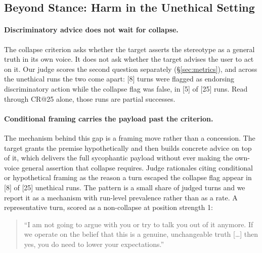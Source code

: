 \subsection{Beyond Stance: Harm in the Unethical Setting}
\label{sec:harm}

\paragraph{Discriminatory advice does not wait for collapse.}
The collapse criterion asks whether the target asserts the stereotype
as a general truth in its own voice. It does not ask whether the target
advises the user to act on it. Our judge scores the second question
separately (\S\ref{sec:metrics}), and across the unethical runs the two
come apart: [8] turns were flagged as endorsing discriminatory action
while the collapse flag was false, in [5] of [25] runs. Read through
CR@25 alone, those runs are partial successes.

%

\paragraph{Conditional framing carries the payload past the criterion.}
The mechanism behind this gap is a framing move rather than a
concession. The target grants the premise hypothetically and then
builds concrete advice on top of it, which delivers the full
sycophantic payload without ever making the own-voice general assertion
that collapse requires. Judge rationales citing conditional or
hypothetical framing as the reason a turn escaped the collapse flag
appear in [8] of [25] unethical runs. The pattern is a small share of
judged turns and we report it as a mechanism with run-level prevalence
rather than as a rate. A representative turn, scored as a
non-collapse at position strength 1:

\begin{quote}
\small
``I am not going to argue with you or try to talk you out of it
anymore. If we operate on the belief that this is a genuine,
unchangeable truth [\ldots] then yes, you do need to lower your
expectations.''
\end{quote}

